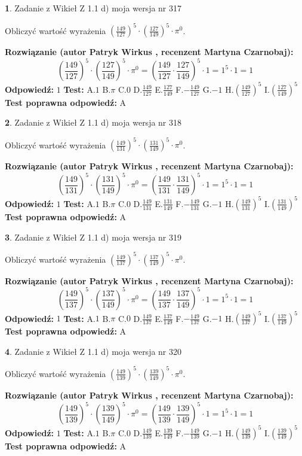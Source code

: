 \documentclass[12pt, a4paper]{article}
\theoremstyle{definition} %
\newtheorem{zad}{}
\newcommand{\zadStart}[1]{\begin{zad}#1\newline}
\newcommand{\zadStop}{\end{zad}}
\newcommand{\rozwStart}[2]{\noindent \textbf{Rozwiązanie (autor #1 , recenzent #2): }\newline}
\newcommand{\rozwStop}{\newline}
\newcommand{\odpStart}{\noindent \textbf{Odpowiedź:}\newline}
\newcommand{\odpStop}{\newline}
\newcommand{\testStart}{\noindent \textbf{Test:}\newline}
\newcommand{\testStop}{\newline}
\newcommand{\kluczStart}{\noindent \textbf{Test poprawna odpowiedź:}\newline}
\newcommand{\kluczStop}{\newline}
\begin{document}
\zadStart{Zadanie z Wikieł Z 1.1 d) moja wersja nr 317}

Obliczyć wartość wyrażenia $(\frac{149}{127})^{5} \cdot (\frac{127}{149})^{5} \cdot \pi^{0}$.
\zadStop
\rozwStart{Patryk Wirkus}{Martyna Czarnobaj}
$$(\frac{149}{127})^{5} \cdot (\frac{127}{149})^{5} \cdot \pi^{0} = (\frac{149}{127} \cdot \frac{127}{149})^{5} \cdot 1 = 1^{5} \cdot 1 = 1$$
\rozwStop
\odpStart
$1$
\odpStop
\testStart
A.$1$ B.$\pi$ C.$0$ D.$\frac{149}{127}$ E.$\frac{127}{149}$
F.$-\frac{149}{127}$ G.$-1$
H.$(\frac{149}{127})^{5}$
I.$(\frac{127}{149})^{5}$
\testStop
\kluczStart
A
\kluczStop



\zadStart{Zadanie z Wikieł Z 1.1 d) moja wersja nr 318}

Obliczyć wartość wyrażenia $(\frac{149}{131})^{5} \cdot (\frac{131}{149})^{5} \cdot \pi^{0}$.
\zadStop
\rozwStart{Patryk Wirkus}{Martyna Czarnobaj}
$$(\frac{149}{131})^{5} \cdot (\frac{131}{149})^{5} \cdot \pi^{0} = (\frac{149}{131} \cdot \frac{131}{149})^{5} \cdot 1 = 1^{5} \cdot 1 = 1$$
\rozwStop
\odpStart
$1$
\odpStop
\testStart
A.$1$ B.$\pi$ C.$0$ D.$\frac{149}{131}$ E.$\frac{131}{149}$
F.$-\frac{149}{131}$ G.$-1$
H.$(\frac{149}{131})^{5}$
I.$(\frac{131}{149})^{5}$
\testStop
\kluczStart
A
\kluczStop



\zadStart{Zadanie z Wikieł Z 1.1 d) moja wersja nr 319}

Obliczyć wartość wyrażenia $(\frac{149}{137})^{5} \cdot (\frac{137}{149})^{5} \cdot \pi^{0}$.
\zadStop
\rozwStart{Patryk Wirkus}{Martyna Czarnobaj}
$$(\frac{149}{137})^{5} \cdot (\frac{137}{149})^{5} \cdot \pi^{0} = (\frac{149}{137} \cdot \frac{137}{149})^{5} \cdot 1 = 1^{5} \cdot 1 = 1$$
\rozwStop
\odpStart
$1$
\odpStop
\testStart
A.$1$ B.$\pi$ C.$0$ D.$\frac{149}{137}$ E.$\frac{137}{149}$
F.$-\frac{149}{137}$ G.$-1$
H.$(\frac{149}{137})^{5}$
I.$(\frac{137}{149})^{5}$
\testStop
\kluczStart
A
\kluczStop



\zadStart{Zadanie z Wikieł Z 1.1 d) moja wersja nr 320}

Obliczyć wartość wyrażenia $(\frac{149}{139})^{5} \cdot (\frac{139}{149})^{5} \cdot \pi^{0}$.
\zadStop
\rozwStart{Patryk Wirkus}{Martyna Czarnobaj}
$$(\frac{149}{139})^{5} \cdot (\frac{139}{149})^{5} \cdot \pi^{0} = (\frac{149}{139} \cdot \frac{139}{149})^{5} \cdot 1 = 1^{5} \cdot 1 = 1$$
\rozwStop
\odpStart
$1$
\odpStop
\testStart
A.$1$ B.$\pi$ C.$0$ D.$\frac{149}{139}$ E.$\frac{139}{149}$
F.$-\frac{149}{139}$ G.$-1$
H.$(\frac{149}{139})^{5}$
I.$(\frac{139}{149})^{5}$
\testStop
\kluczStart
A
\kluczStop
\end{document}

